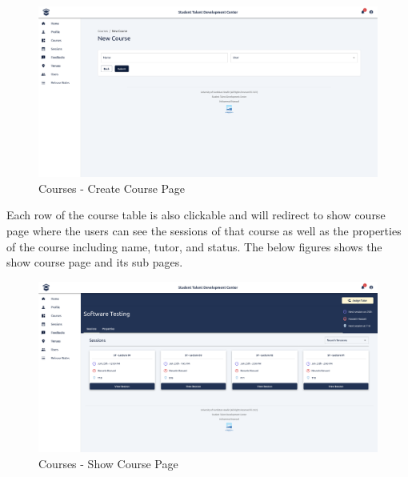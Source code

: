\begin{justify}
    \begin{figure}[H]
        \centerline{\includegraphics[width=150mm,scale=1]{figures/implementation_and_testing/implementation/frontend/pages/Courses - Create New Course.png}}
        \caption{Courses - Create Course Page}
    \end{figure}

    \vspace{0.25cm}
    \newendline Each row of the course table is also clickable and will redirect to show course page where the users can see the sessions of that course as well as the properties of the course including name, tutor, and status. The below figures shows the show course page and its sub pages.

    \begin{figure}[H]
        \centerline{\includegraphics[width=150mm,scale=1]{figures/implementation_and_testing/implementation/frontend/pages/Courses - Show.png}}
        \caption{Courses - Show Course Page}
    \end{figure}


\end{justify}
